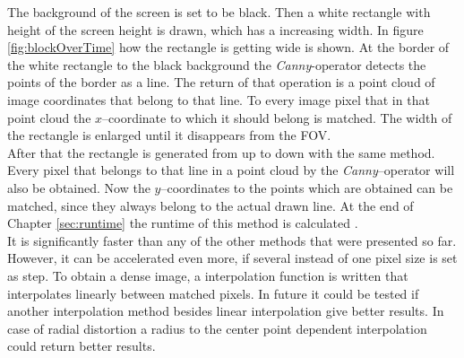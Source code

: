 \documentclass[journal,final,a4paper,twoside]{PS}
\begin{document}
The background of the screen is set to be black. Then a white rectangle with height of the screen height is drawn, which has a increasing width. In figure \ref{fig:blockOverTime} how the rectangle is getting wide is shown. At the border of the white rectangle to the black background the \emph{Canny}-operator detects the points of the border as a line. The return of that operation is a point cloud of image coordinates that belong to that line. To every image pixel that in that point cloud the $x$--coordinate to which it should belong is matched. The width of the rectangle is enlarged until it disappears from the FOV.\\
After that the rectangle is generated from up to down with the same method. Every pixel that belongs to that line in a point cloud by the \emph{Canny}--operator will also be obtained. Now the $y$--coordinates to the points which are obtained can be matched, since they always belong to the actual drawn line. At the end of Chapter \ref{sec:runtime} the runtime of this method is calculated .\\
It is significantly faster than any of the other methods that were presented so far. However, it can be accelerated even more, if several instead of one pixel size is set as step. To obtain a dense image, a interpolation function is written that interpolates linearly between matched pixels. In future it could be tested if another interpolation method besides linear interpolation give better results. In case of radial distortion a radius to the center point dependent interpolation could return better results.\\
\end{document}
